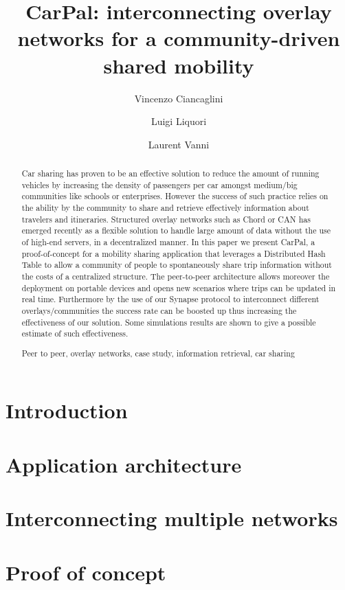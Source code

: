 \documentclass{llncs}
\title{CarPal: interconnecting overlay networks for a community-driven shared mobility} \up{4}
\author{Vincenzo Ciancaglini\inst{1} \and Luigi Liquori \inst{1} %
     \and Laurent Vanni \inst{1}}
\institute{Institut National de Recherche en Informatique et
  Automatique, France\\
  Email: {\tt firstName.lastName@sophia.inria.fr} %
  }
\newcommand{\up}[1]    {\vspace{-#1mm}}
\begin{document}
\maketitle
  
\begin{abstract}\up{4}
  Car sharing has proven to be an effective solution 
  to reduce the amount of running vehicles by increasing the density of passengers per car
  amongst medium/big communities like schools or enterprises.
  However the success of such practice relies on the ability by the community to share and retrieve
  effectively information about travelers and itineraries.
  Structured overlay networks such as Chord or CAN has emerged recently as a flexible 
  solution to handle large amount of data without the use of high-end servers, 
  in a decentralized manner.
  In this paper we present CarPal, a proof-of-concept for a mobility sharing application that leverages
  a Distributed Hash Table to allow a community of people to spontaneously share trip information without 
  the costs of a centralized structure.
  The peer-to-peer architecture allows moreover the deployment on portable devices and opens new scenarios
  where trips can be updated in real time.
  Furthermore by the use of our Synapse protocol to interconnect different overlays/communities the success rate can be boosted
  up thus increasing the effectiveness of our solution. Some simulations results are shown to give
  a possible estimate of such effectiveness.

   Peer to peer, overlay networks, case study,
  information retrieval, car sharing  \up{2}
\end{abstract}

  
\up{4}
\section{Introduction\label{sec:introduction}}
\up{3}

\up{3}
\section{Application architecture\label{sec:architecture}}
\up{3}

\up{3}
\section{Interconnecting multiple networks\label{sec:link}}
\up{3}

\up{3}
\section{Proof of concept\label{sec:proof}}
\up{3}

\up{3}
\end{document}
